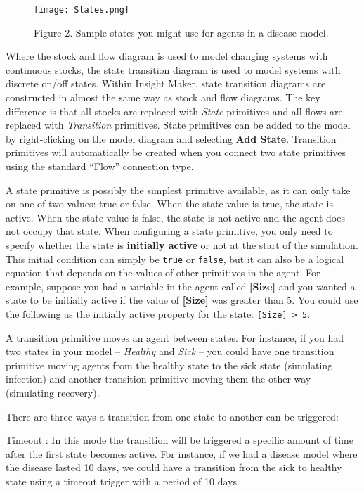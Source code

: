 \documentclass[]{memoir}
\let\Oldincludegraphics\includegraphics
\renewcommand{\includegraphics}[1]{\Oldincludegraphics[max size={\textwidth}{\textheight}]{#1}}
\newcommand{\p}[1]{\textbf{{[}#1{]}}}
\renewcommand{\u}[1]{\textbf{#1}}
\renewcommand{\a}[1]{\textbf{#1}}
\begin{document}
\begin{figure}[htbp]
\centering
\texttt{[image: States.png]}
\caption{Figure 2. Sample states you might use for agents in a disease
model.}
\end{figure}

Where the stock and flow diagram is used to model changing systems with
continuous stocks, the state transition diagram is used to model systems
with discrete on/off states. Within Insight Maker, state transition
diagrams are constructed in almost the same way as stock and flow
diagrams. The key difference is that all stocks are replaced with
\emph{State} primitives and all flows are replaced with
\emph{Transition} primitives. State primitives can be added to the model
by right-clicking on the model diagram and selecting \u{Add State}.
Transition primitives will automatically be created when you connect two
state primitives using the standard ``Flow'' connection type.

A state primitive is possibly the simplest primitive available, as it
can only take on one of two values: true or false. When the state value
is true, the state is active. When the state value is false, the state
is not active and the agent does not occupy that state. When configuring
a state primitive, you only need to specify whether the state is
\a{initially active} or not at the start of the simulation. This initial
condition can simply be \lstinline!true! or \lstinline!false!, but it
can also be a logical equation that depends on the values of other
primitives in the agent. For example, suppose you had a variable in the
agent called \p{Size} and you wanted a state to be initially active if
the value of \p{Size} was greater than 5. You could use the following as
the initially active property for the state: \lstinline![Size] > 5!.

A transition primitive moves an agent between states. For instance, if
you had two states in your model -- \emph{Healthy} and \emph{Sick} --
you could have one transition primitive moving agents from the healthy
state to the sick state (simulating infection) and another transition
primitive moving them the other way (simulating recovery).

There are three ways a transition from one state to another can be
triggered:

Timeout : In this mode the transition will be triggered a specific
amount of time after the first state becomes active. For instance, if we
had a disease model where the disease lasted 10 days, we could have a
transition from the sick to healthy state using a timeout trigger with a
period of 10 days.
\end{document}
